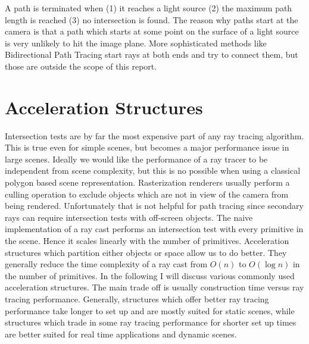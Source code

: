 \documentclass{ACGSeminar}
\begin{document}
A path is terminated when (1) it reaches a light source (2) the maximum path length is reached (3) no intersection is found.
The reason why paths start at the camera is that a path which starts at some point on the surface of a light source is very unlikely to hit the image plane. More sophisticated methods like Bidirectional Path Tracing start rays at both ends and try to connect them, but those are outside the scope of this report.

\section{Acceleration Structures} \label{acceleration}
Intersection tests are by far the most expensive part of any ray tracing algorithm. \cite[7]{Whitted:1980} This is true even for simple scenes, but becomes a major performance issue in large scenes. Ideally we would like the performance of a ray tracer to be independent from scene complexity, but this is no possible when using a classical polygon based scene representation.
Rasterization renderers usually perform a culling operation to exclude objects which are not in view of the camera from being rendered. Unfortunately that is not helpful for path tracing since secondary rays can require intersection tests with off-screen objects.
The naive implementation of a ray cast performs an intersection test with every primitive in the scene. Hence it scales linearly with the number of primitives. Acceleration structures which partition either objects or space allow us to do better. They generally reduce the time complexity of a ray cast from $O(n)$ to $O(\log n)$ in the number of primitives. In the following I will discuss various commonly used acceleration structures. The main trade off is usually construction time versus ray tracing performance. Generally, structures which offer better ray tracing performance take longer to set up and are mostly suited for static scenes, while structures which trade in some ray tracing performance for shorter set up times are better suited for real time applications and dynamic scenes. \cite{Karras:2012:MPC:2383795.2383801}
\end{document}
